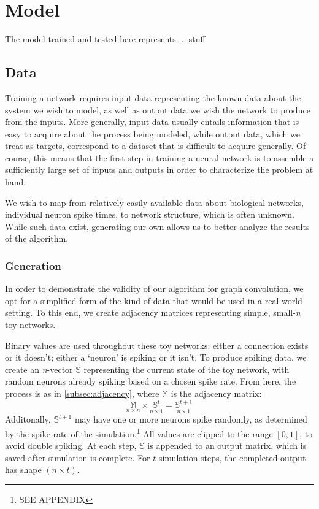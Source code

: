 \graphicspath{ {resources/} }
\chapter{Model}
\label{model}
The model trained and tested here represents ... stuff

\section{Data}
\label{sec:data}
Training a network requires input data representing the known data about the 
system we
wish to model, as well as output data we wish the network to produce from the
inputs. More generally, input data usually entails information that is easy to 
acquire about the process being modeled, while output data, which we treat as 
targets,
correspond to a dataset that is difficult to acquire generally. Of course, this 
means that the first step in training a neural network is to assemble a 
sufficiently large set of inputs and outputs in order to characterize the 
problem at hand.

We wish to map from relatively easily available data about biological networks, 
individual neuron spike times, to network structure, which is often unknown.  
While such data exist, generating our own allows us to better analyze the 
results of the algorithm.


\subsection{Generation}
\label{subsec:generation}
In order to demonstrate the validity of our algorithm for graph convolution, we 
opt for a simplified form of the kind of data that would be used in a real-world 
setting.  To this end, we create adjacency matrices representing simple, 
small-\textit{n} toy networks.

\begin{table}[h]
	\centering
	
	\hspace{2em}
	\label{fig:toyex}
\end{table}\noindent
Binary values are used throughout these toy networks: either a connection exists 
or it doesn't; either a `neuron' is spiking or it isn't. To produce spiking 
data, we create an \textit{n}-vector $\mathbb{S}$ representing the current state 
of the toy network, with random neurons already spiking based on a chosen spike 
rate. From here, the process is as in \ref{subsec:adjacency}, where $\mathbb{M}$ 
is the adjacency matrix:
\[
	\underset{n \times n}{\mathbb{M}} \times \underset{n \times 1}{\mathbb{S}^t} 
	= \underset{n \times 1}{\mathbb{S}^{t+1}}
\]
Additonally, $\mathbb{S}^{t+1}$ may have one or more neurons spike randomly, as 
determined by the spike rate of the simulation.\footnote{SEE APPENDIX} All 
values are clipped to the range $[0,1]$, to avoid double spiking. At each step, 
$\mathbb{S}$ is appended to an output matrix, which is saved after simulation is 
complete. For $t$ simulation steps, the completed output has shape $(n \times 
t)$.

